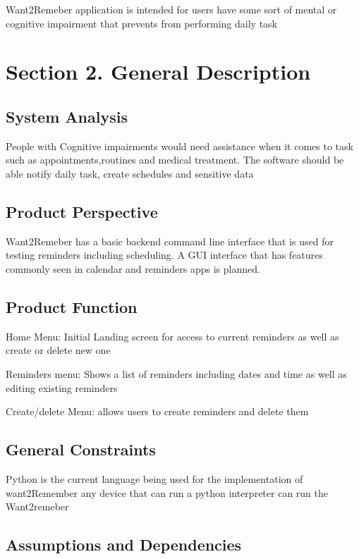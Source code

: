 \documentclass[
]{article}
\begin{document}
Want2Remeber application is intended for users have some sort of mental
or cognitive impairment that prevents from performing daily task

\section{Section 2. General
Description}\label{section-2.-general-description}

\subsection{System Analysis}\label{system-analysis}

People with Cognitive impairments would need assistance when it comes to
task such as appointments,routines and medical treatment. The software
should be able notify daily task, create schedules and sensitive data

\subsection{Product Perspective}\label{product-perspective}

Want2Remeber has a basic backend command line interface that is used for
testing reminders including scheduling. A GUI interface that has
features commonly seen in calendar and reminders apps is planned.

\subsection{Product Function}\label{product-function}

Home Menu: Initial Landing screen for access to current reminders as
well as create or delete new one

Reminders menu: Shows a list of reminders including dates and time as
well as editing existing reminders

Create/delete Menu: allows users to create reminders and delete them

\subsection{General Constraints}\label{general-constraints}

Python is the current language being used for the implementation of
want2Remember any device that can run a python interpreter can run the
Want2remeber

\subsection{Assumptions and
Dependencies}\label{assumptions-and-dependencies}
\end{document}
